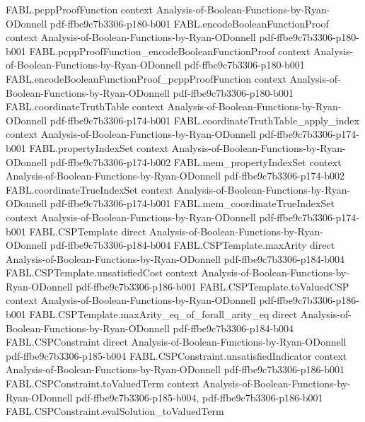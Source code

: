 \begin{theorem}
  {FABL.pcppProofFunction}
  {context}
  {Analysis-of-Boolean-Functions-by-Ryan-ODonnell}
  {pdf-ffbe9c7b3306-p180-b001}
\proofstep
  {FABL.encodeBooleanFunctionProof}
  {context}
  {Analysis-of-Boolean-Functions-by-Ryan-ODonnell}
  {pdf-ffbe9c7b3306-p180-b001}
\proofstep
  {FABL.pcppProofFunction_encodeBooleanFunctionProof}
  {context}
  {Analysis-of-Boolean-Functions-by-Ryan-ODonnell}
  {pdf-ffbe9c7b3306-p180-b001}
\proofstep
  {FABL.encodeBooleanFunctionProof_pcppProofFunction}
  {context}
  {Analysis-of-Boolean-Functions-by-Ryan-ODonnell}
  {pdf-ffbe9c7b3306-p180-b001}
\proofstep
  {FABL.coordinateTruthTable}
  {context}
  {Analysis-of-Boolean-Functions-by-Ryan-ODonnell}
  {pdf-ffbe9c7b3306-p174-b001}
\proofstep
  {FABL.coordinateTruthTable_apply_index}
  {context}
  {Analysis-of-Boolean-Functions-by-Ryan-ODonnell}
  {pdf-ffbe9c7b3306-p174-b001}
\proofstep
  {FABL.propertyIndexSet}
  {context}
  {Analysis-of-Boolean-Functions-by-Ryan-ODonnell}
  {pdf-ffbe9c7b3306-p174-b002}
\proofstep
  {FABL.mem_propertyIndexSet}
  {context}
  {Analysis-of-Boolean-Functions-by-Ryan-ODonnell}
  {pdf-ffbe9c7b3306-p174-b002}
\proofstep
  {FABL.coordinateTrueIndexSet}
  {context}
  {Analysis-of-Boolean-Functions-by-Ryan-ODonnell}
  {pdf-ffbe9c7b3306-p174-b001}
\proofstep
  {FABL.mem_coordinateTrueIndexSet}
  {context}
  {Analysis-of-Boolean-Functions-by-Ryan-ODonnell}
  {pdf-ffbe9c7b3306-p174-b001}
\proofstep
  {FABL.CSPTemplate}
  {direct}
  {Analysis-of-Boolean-Functions-by-Ryan-ODonnell}
  {pdf-ffbe9c7b3306-p184-b004}
\proofstep
  {FABL.CSPTemplate.maxArity}
  {direct}
  {Analysis-of-Boolean-Functions-by-Ryan-ODonnell}
  {pdf-ffbe9c7b3306-p184-b004}
\proofstep
  {FABL.CSPTemplate.unsatisfiedCost}
  {context}
  {Analysis-of-Boolean-Functions-by-Ryan-ODonnell}
  {pdf-ffbe9c7b3306-p186-b001}
\proofstep
  {FABL.CSPTemplate.toValuedCSP}
  {context}
  {Analysis-of-Boolean-Functions-by-Ryan-ODonnell}
  {pdf-ffbe9c7b3306-p186-b001}
\proofstep
  {FABL.CSPTemplate.maxArity_eq_of_forall_arity_eq}
  {direct}
  {Analysis-of-Boolean-Functions-by-Ryan-ODonnell}
  {pdf-ffbe9c7b3306-p184-b004}
\proofstep
  {FABL.CSPConstraint}
  {direct}
  {Analysis-of-Boolean-Functions-by-Ryan-ODonnell}
  {pdf-ffbe9c7b3306-p185-b004}
\proofstep
  {FABL.CSPConstraint.unsatisfiedIndicator}
  {context}
  {Analysis-of-Boolean-Functions-by-Ryan-ODonnell}
  {pdf-ffbe9c7b3306-p186-b001}
\proofstep
  {FABL.CSPConstraint.toValuedTerm}
  {context}
  {Analysis-of-Boolean-Functions-by-Ryan-ODonnell}
  {pdf-ffbe9c7b3306-p185-b004,
    pdf-ffbe9c7b3306-p186-b001}
\proofstep
  {FABL.CSPConstraint.evalSolution_toValuedTerm}

\end{theorem}
